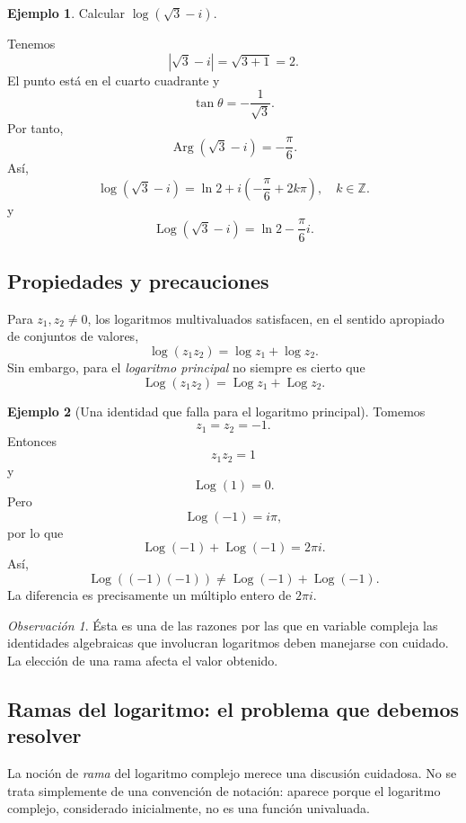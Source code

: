 \documentclass[12pt]{article}
\theoremstyle{definition}
\newtheorem{ejemplo}{Ejemplo}[section]
\theoremstyle{remark}
\newtheorem{observacion}{Observación}[section]
\begin{document}
\begin{ejemplo}
Calcular $\log(\sqrt3-i)$.

Tenemos
\[
|\sqrt3-i|=\sqrt{3+1}=2.
\]
El punto está en el cuarto cuadrante y
\[
\tan\theta=-\frac{1}{\sqrt3}.
\]
Por tanto,
\[
\operatorname{Arg}(\sqrt3-i)=-\frac{\pi}{6}.
\]
Así,
\[
\boxed{
\log(\sqrt3-i)
=
\ln2+i\left(-\frac{\pi}{6}+2k\pi\right),
\quad k\in\mathbb Z.
}
\]
y
\[
\boxed{
\operatorname{Log}(\sqrt3-i)=\ln2-\frac{\pi}{6}i.
}
\]
\end{ejemplo}

\subsection{Propiedades y precauciones}

Para $z_1,z_2\neq0$, los logaritmos multivaluados satisfacen, en el sentido
apropiado de conjuntos de valores,
\[
\log(z_1z_2)=\log z_1+\log z_2.
\]
Sin embargo, para el \emph{logaritmo principal} no siempre es cierto que
\[
\operatorname{Log}(z_1z_2)
=
\operatorname{Log}z_1+\operatorname{Log}z_2.
\]

\begin{ejemplo}[Una identidad que falla para el logaritmo principal]
Tomemos
\[
z_1=z_2=-1.
\]
Entonces
\[
z_1z_2=1
\]
y
\[
\operatorname{Log}(1)=0.
\]
Pero
\[
\operatorname{Log}(-1)=i\pi,
\]
por lo que
\[
\operatorname{Log}(-1)+\operatorname{Log}(-1)
=2\pi i.
\]
Así,
\[
\boxed{
\operatorname{Log}((-1)(-1))
\neq
\operatorname{Log}(-1)+\operatorname{Log}(-1).
}
\]
La diferencia es precisamente un múltiplo entero de $2\pi i$.
\end{ejemplo}

\begin{observacion}
Ésta es una de las razones por las que en variable compleja las identidades
algebraicas que involucran logaritmos deben manejarse con cuidado. La elección
de una rama afecta el valor obtenido.
\end{observacion}

\subsection{Ramas del logaritmo: el problema que debemos resolver}

La noción de \emph{rama} del logaritmo complejo merece una discusión cuidadosa.
No se trata simplemente de una convención de notación: aparece porque el
logaritmo complejo, considerado inicialmente, no es una función univaluada.
\end{document}
